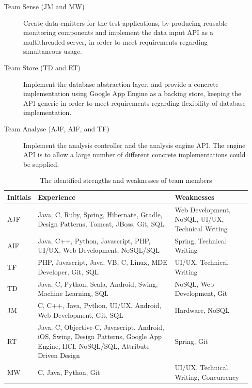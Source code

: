 \begin{description}
  \item[Team Sense (JM and MW)] Create data emitters for the test 
  applications, by producing reusable monitoring components and 
  implement the data input API as a multithreaded server, in order to 
  meet requirements regarding simultaneous usage.
    
  \item[Team Store (TD and RT)] Implement the database abstraction layer, and provide a concrete implementation using Google App Engine as a backing store, keeping the API generic in order to meet requirements regarding flexibility of database implementation.

  \item[Team Analyse (AJF, AIF, and TF)] Implement the analysis controller and 
  the analysis engine API. The engine API is to allow a large number of 
  different concrete implementations could be supplied. 
\end{description}

\begin{table}[H]
\centering
\begin{tabular}{|p{1.2cm}|p{8cm}|p{5cm}|}
  \hline \rowcolor{titleColor}\textbf{Initials} &
  \textbf{Experience} &
  \textbf{Weaknesses}\\

  \hline AJF
  & Java, C, Ruby, Spring, Hibernate, Gradle, Design Patterns, Tomcat, JBoss,
  Git, SQL
  & Web Development, NoSQL, UI/UX, Technical Writing \\

  \hline AIF
  & Java, C++, Python, Javascript, PHP, UI/UX, Web Development, NoSQL/SQL
  & Spring, Technical Writing \\
  
  \hline TF
  & PHP, Javascript, Java, VB, C, Linux, MDE Developer, Git, SQL
  & UI/UX, Technical Writing \\

  \hline TD
  & Java, C, Python, Scala, Android, Swing, Machine Learning, SQL
  & NoSQL, Web Development, Git \\

  \hline JM
  & C, C++, Java, Python, UI/UX, Android, Web Development, Git, SQL
  & Hardware, NoSQL \\

  \hline RT
  & Java, C, Objective-C, Javascript, Android, iOS, Swing, Design Patterns,
  Google App Engine, HCI, NoSQL/SQL, Attribute Driven Design
  & Spring, Git \\

  \hline MW
  & C, Java, Python, Git
  & UI/UX, Technical Writing, Concurrency \\
  \hline
\end{tabular}
\caption{The identified strengths and weaknesses of team members}
\label{tab:skills}
\end{table}

